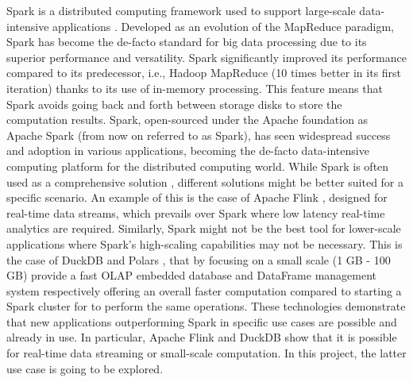 Spark is a distributed computing framework used to support large-scale data-intensive applications \cite{zaharia2010spark}. Developed as an evolution of the MapReduce paradigm, Spark has become the de-facto standard for big data processing due to its superior performance and versatility. Spark significantly improved its performance compared to its predecessor, i.e., Hadoop MapReduce (10 times better in its first iteration) \cite{zaharia2010spark} thanks to its use of in-memory processing. This feature means that Spark avoids going back and forth between storage disks to store the computation results. Spark, open-sourced under the Apache foundation as Apache Spark (from now on referred to as Spark), has seen widespread success and adoption in various applications, becoming the de-facto data-intensive computing platform for the distributed computing world. While Spark is often used as a comprehensive solution \cite{zahariaApacheSparkUnified2016}, different solutions might be better suited for a specific scenario.
An example of this is the case of Apache Flink \cite{carboneApacheFlinkStream}, designed for real-time data streams, which prevails over Spark where low latency real-time analytics are required. Similarly, Spark might not be the best tool for lower-scale applications where Spark's high-scaling capabilities may not be necessary. This is the case of DuckDB \cite{raasveldtDuckDBEmbeddableAnalytical2019} and Polars \cite{vinkWroteOneFastest2021}, that by focusing on a small scale (1 GB - 100 GB) provide a fast \gls{OLAP} embedded database and DataFrame management system respectively offering an overall faster computation compared to starting a Spark cluster for to perform the same operations. These technologies demonstrate that new applications outperforming Spark in specific use cases are possible and already in use. In particular, Apache Flink and DuckDB show that it is possible for real-time data streaming or small-scale computation. In this project, the latter use case is going to be explored.

